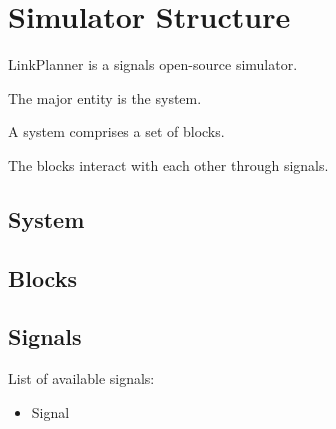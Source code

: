 
\chapter{Simulator Structure}

LinkPlanner is a signals open-source simulator.

The major entity is the system.

A system comprises a set of blocks.

The blocks interact with each other through signals.

\section{System}

\section{Blocks}

\section{Signals}

List of available signals:

\begin{itemize}
    \item Signal

\end{itemize}








